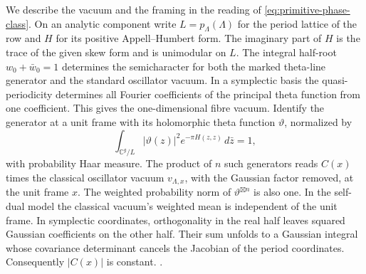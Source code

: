 We describe the vacuum and the framing in the reading of
\eqref{eq:primitive-phase-class}. On an analytic component
write \(L=p_\Lambda(\Lambda)\) for the period lattice of
the row and \(H\) for its positive Appell--Humbert form.
The imaginary part of \(H\) is the trace of the given
skew form and is unimodular on \(L\). The integral
half-root \(w_0+\bar w_0=1\) determines the semicharacter
for both the marked theta-line generator and the
standard oscillator vacuum. In a symplectic basis the
quasi-periodicity determines all Fourier coefficients
of the principal theta function from one coefficient.
This gives the one-dimensional fibre vacuum. Identify
the generator at a unit frame with its holomorphic
theta function \(\vartheta\), normalized by
\[
 \int_{\mathbb C^g/L}|\vartheta(z)|^2
          e^{-\pi H(z,z)}\,d\bar z=1,
\]
with probability Haar measure. The product of \(n\)
such generators reads \(C(x)\) times the classical
oscillator vacuum \(v_{\Lambda,x}\), with the Gaussian
factor removed, at the unit frame \(x\). The weighted
probability norm of \(\vartheta^{\boxtimes n}\) is also
one. In the self-dual model the classical vacuum's
weighted mean is independent of the unit frame. In
symplectic coordinates, orthogonality in the real half
leaves squared Gaussian coefficients on the other
half. Their sum unfolds to a Gaussian integral whose
covariance determinant cancels the Jacobian of the
period coordinates. Consequently \(|C(x)|\) is constant.
.

